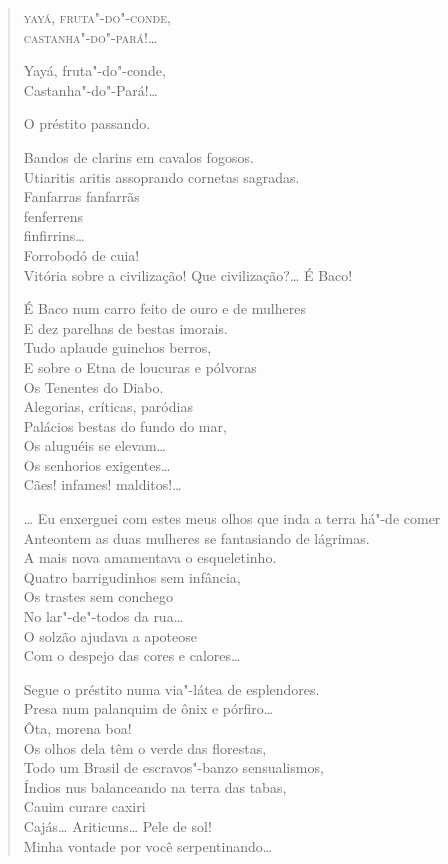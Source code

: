 {\begin{verse}
\quad\quad\quad\quad\quad{}\textsc{yayá, fruta"-do"-conde},\\
\quad\quad\quad\quad\quad{}\textsc{castanha"-do"-pará!}\ldots{}

\quad\quad\quad\quad\quad\quad\quad{}Yayá, fruta"-do"-conde,\\
\quad\quad\quad\quad\quad\quad\quad{}Castanha"-do"-Pará!\ldots{}

O préstito passando.

Bandos de clarins em cavalos fogosos.\\
Utiaritis aritis assoprando cornetas sagradas.\\
Fanfarras fanfarrãs\\
\qquad\qquad\qquad{}fenferrens\\
\qquad\qquad\qquad\qquad{}finfirrins\ldots{}\\
\qquad\qquad\qquad\qquad\qquad{}Forrobodó de cuia!\\
Vitória sobre a civilização! Que civilização?\ldots{} É Baco!

É Baco num carro feito de ouro e de mulheres\\
E dez parelhas de bestas imorais.\\
Tudo aplaude guinchos berros,\\
E sobre o Etna de loucuras e pólvoras\\
Os Tenentes do Diabo.\\
Alegorias, críticas, paródias\\
Palácios bestas do fundo do mar,\\
Os aluguéis se elevam\ldots{}\\
\quad{}Os senhorios exigentes\ldots{}\\
\quad\quad{}Cães! infames! malditos!\ldots{}

\ldots{} Eu enxerguei com estes meus olhos que inda a terra há"-de comer\\
Anteontem as duas mulheres se fantasiando de lágrimas.\\
A mais nova amamentava o esqueletinho.\\
Quatro barrigudinhos sem infância,\\
Os trastes sem conchego\\
No lar"-de"-todos da rua\ldots{}\\
O solzão ajudava a apoteose\\
Com o despejo das cores e calores\ldots{}

Segue o préstito numa via"-látea de esplendores.\\
Presa num palanquim de ônix e pórfiro\ldots{}\\
Ôta, morena boa!\\
Os olhos dela têm o verde das florestas,\\
Todo um Brasil de escravos"-banzo sensualismos,\\
Índios nus balanceando na terra das tabas,\\
Cauim curare caxiri\\
Cajás\ldots{} Ariticuns\ldots{} Pele de sol!\\
Minha vontade por você serpentinando\ldots{}


\end{verse}}
